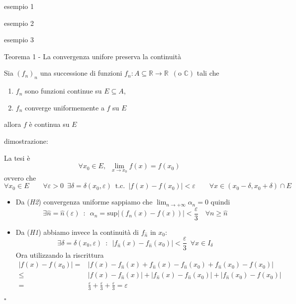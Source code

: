 \documentclass[x11names]{article}
\newcommand*{\QEDB}{\null\nobreak\hfill\ensuremath{\square}}%
\newcommand{\esempio}[2]{
	\begin{es}{esempio #1}
		#2
	\end{es}
}
\newcommand{\teorema}[2]{
	\begin{center}
		\fboxsep11pt
		\colorbox{myred}{\begin{minipage}{5.75in}
				\begin{redes}{#1}
					#2
				\end{redes}
		\end{minipage}}
	\end{center}
}
\newcommand{\dimostrazione}[2]{
	\begin{dym}{dimostrazione: #1}
		#2
		\QEDB
	\end{dym}
}
\begin{document}
\esempio{1}{}
\esempio{2}{}
\esempio{3}{}



\teorema{Teorema 1 - La convergenza unifore preserva la continuità}{
Sia \((f_{n})_{n}\) una successione di funzioni \(f_{n}:A\subseteq \mathbb{R}\to \mathbb{R} \;\ (\text{o } \mathbb{C})\) tali che
\begin{enumerate}[start=1,label={(\itshape H\arabic*)}]
	\item \(f_{n}\) sono funzioni continue su \(E\subseteq A\),
	\item \(f_{n}\) converge uniformemente a \(f\) su \(E\)
\end{enumerate}
allora \(f\) è continua su \(E\)
}
\dimostrazione{}{
La tesi è 
\[ 
\forall x_{0} \in E, \;\ \lim_{x\to x_{0}} f(x) = f(x_{0})
\]
ovvero che
\[ 
\forall x_{0} \in E \qquad \forall \varepsilon > 0 \;\ \exists \delta = \delta(x_{0},\varepsilon) \;\ \text{t.c.} \;\ |f(x) - f(x_{0})| < \varepsilon \qquad \forall x \in (x_{0}-\delta,x_{0}+\delta) \cap E 
\]
\begin{itemize}
	\item Da (\textit{H2}) convergenza uniforme sappiamo che \( \lim_{n\to + \infty} \alpha _{n} = 0\) quindi 
	\[\exists \hat{n} = \hat{n}(\varepsilon) \;\ : \;\ \alpha_{n} = \text{sup}|(f_{n}(x) - f(x))| < \frac{\varepsilon}{3} \quad \forall n\geq\hat{n}
	\]
	\item Da (\textit{H1}) abbiamo invece la continuità di \(f_{\hat{n}}\) in \(x_{0}\):
	\[ 
	\exists \delta = \delta(x_{0},\varepsilon) \;\ : \;\ | f_{\hat{n}}(x) - f_{\hat{n}}(x_{0}) | < \frac{\varepsilon}{3} \;\ \forall x \in I_{\delta}
 	\]
 	Ora utilizzando la riscrittura
 	\begin{align*}
 		| f(x) - f(x_{0}) |  =& | f(x) - f_{\hat{n}}(x) + f_{\hat{n}}(x)  - f_{\hat{n}}(x_{0}) + f_{\hat{n}}(x_{0}) - f(x_{0})| \\
 		\leq & |f(x) - f_{\hat{n}}(x)| + |f_{\hat{n}}(x) -f_{\hat{n}}(x_{0})| + |f_{\hat{n}}(x_{0}) - f(x_{0})| \\
 		= & \frac{\varepsilon}{3} + \frac{\varepsilon}{3} + \frac{\varepsilon}{3}  = \varepsilon
 	\end{align*}
\end{itemize} }
\end{document}

